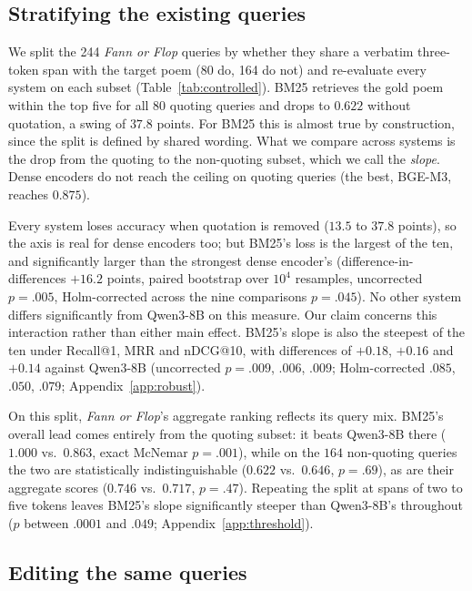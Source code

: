 \documentclass[11pt]{article}
\begin{document}
\subsection{Stratifying the existing queries}
\label{sec:strat}

We split the 244 \textit{Fann or Flop} queries by whether they share a verbatim three-token span with the target poem (80 do, 164 do not) and re-evaluate every system on each subset (Table~\ref{tab:controlled}). BM25 retrieves the gold poem within the top five for all $80$ quoting queries and drops to $0.622$ without quotation, a swing of $37.8$ points. For BM25 this is almost true by construction, since the split is defined by shared wording. What we compare across systems is the drop from the quoting to the non-quoting subset, which we call the \emph{slope}. Dense encoders do not reach the ceiling on quoting queries (the best, BGE-M3, reaches $0.875$).

Every system loses accuracy when quotation is removed ($13.5$ to $37.8$ points), so the axis is real for dense encoders too; but BM25's loss is the largest of the ten, and significantly larger than the strongest dense encoder's (difference-in-differences $+16.2$ points, paired bootstrap over $10^4$ resamples, uncorrected $p{=}.005$, Holm-corrected across the nine comparisons $p{=}.045$). No other system differs significantly from Qwen3-8B on this measure. Our claim concerns this interaction rather than either main effect. BM25's slope is also the steepest of the ten under Recall@1, MRR and nDCG@10, with differences of $+0.18$, $+0.16$ and $+0.14$ against Qwen3-8B (uncorrected $p{=}.009$, $.006$, $.009$; Holm-corrected $.085$, $.050$, $.079$; Appendix~\ref{app:robust}).

On this split, \textit{Fann or Flop}'s aggregate ranking reflects its query mix. BM25's overall lead comes entirely from the quoting subset: it beats Qwen3-8B there ($1.000$ vs.\ $0.863$, exact McNemar $p{=}.001$), while on the $164$ non-quoting queries the two are statistically indistinguishable ($0.622$ vs.\ $0.646$, $p{=}.69$), as are their aggregate scores ($0.746$ vs.\ $0.717$, $p{=}.47$). Repeating the split at spans of two to five tokens leaves BM25's slope significantly steeper than Qwen3-8B's throughout ($p$ between $.0001$ and $.049$; Appendix~\ref{app:threshold}).

\subsection{Editing the same queries}
\label{sec:edits}
\end{document}
